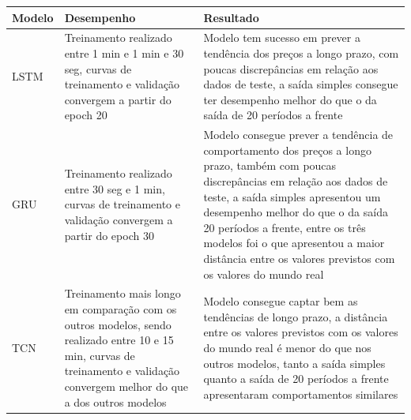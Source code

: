 \begin{center}
\begin{tabular}{|| m{5em} m{5cm} m{5cm}}
     \hline
     Modelo & Desempenho & Resultado \\ [0.5ex]
     \hline\hline
     LSTM & Treinamento realizado entre 1 min e 1 min e 30 seg, curvas de treinamento e validação convergem a partir do epoch 20 & Modelo tem sucesso em prever a tendência dos preços a longo prazo, com poucas discrepâncias em relação aos dados de teste, a saída simples consegue ter desempenho melhor do que o da saída de 20 períodos a frente \\
     \hline
     GRU & Treinamento realizado entre 30 seg e 1 min, curvas de treinamento e validação convergem a partir do epoch 30 & Modelo consegue prever a tendência de comportamento dos preços a longo prazo, também com poucas discrepâncias em relação aos dados de teste, a saída simples apresentou um desempenho melhor do que o da saída 20 períodos a frente, entre os três modelos foi o que apresentou a maior distância entre os valores previstos com os valores do mundo real \\
     \hline
     TCN & Treinamento mais longo em comparação com os outros modelos, sendo realizado entre 10 e 15 min, curvas de treinamento e validação convergem melhor do que a dos outros modelos & Modelo consegue captar bem as tendências de longo prazo, a distância entre os valores previstos com os valores do mundo real é menor do que nos outros modelos, tanto a saída simples quanto a saída de 20 períodos a frente apresentaram comportamentos similares \\ [1ex]
     \hline
\end{tabular}
\end{center}
